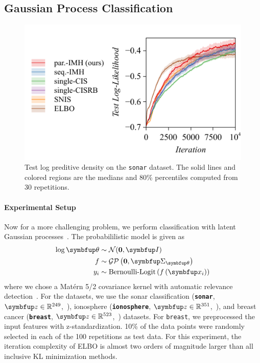   \vspace{-0.05in}
\subsection{Gaussian Process Classification}\label{section:bgp}
%
\begin{figure}[H]
  \centering
     \includegraphics[scale=0.75]{figures/sonar_01.pdf}
  \caption{Test log preditive density on the \texttt{sonar} dataset.
    The solid lines and colored regions are the medians and 80\% percentiles computed from 30 repetitions.
  }\label{fig:logistic}
\end{figure}
%

%
  \vspace{-0.05in}
\paragraph{Experimental Setup}
Now for a more challenging problem, we perform classification with latent Gaussian processes~\citep{rasmussen_gaussian_2006, NIPS2014_8c6744c9}.
The probabililistic model is given as
\begin{align*}
  \log \vtheta &\sim \mathcal{N}(\mathbf{0}, \mI) \\
   f &\sim \mathcal{GP}\left(\mathbf{0}, \mSigma_{\vtheta}\right) \\
   y_i &\sim \text{Bernoulli-Logit}\left(  f\left( \vx_i \right) \right)
\end{align*}
where we chose a Mat\'ern 5/2 covariance kernel with automatic relevance detection~\citep{neal_bayesian_1996}.
For the datasets, we use the sonar classification (\textbf{\texttt{sonar}}, \(\vz \in \mathbb{R}^{249}\),~\citealt{gorman_analysis_1988}), ionosphere (\textbf{\texttt{ionosphere}}, \(\vz \in \mathbb{R}^{351}\),~\citealt{Sigillito1989ClassificationOR}), and breast cancer (\textbf{\texttt{breast}}, \(\vz \in \mathbb{R}^{523}\),~\citealt{wolberg_multisurface_1990}) datasets.
For \texttt{breast}, we preprocessed the input features with z-standardization.
10\% of the data points were randomly selected in each of the 100 repetitions as test data.
For this experiment, the iteration complexity of ELBO is almost two orders of magnitude larger than all inclusive KL minimization methods.

